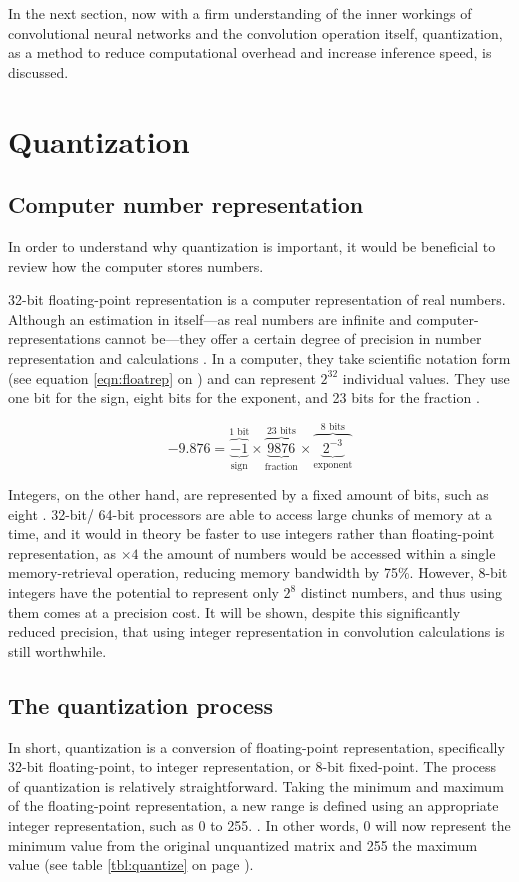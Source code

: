 In the next section, now with a firm understanding of the inner workings of convolutional neural networks and the convolution operation itself, quantization, as a method to reduce computational overhead and increase inference speed, is discussed.

\section{Quantization}
\subsection{Computer number representation}
In order to understand why quantization is important, it would be beneficial to review how the computer stores numbers.

32-bit floating-point representation is a computer representation of real numbers. Although an estimation in itself---as real numbers are infinite and computer-representations cannot be---they offer a certain degree of precision in number representation and calculations \cite{ieee}. In a computer, they take scientific notation form (see equation \ref{eqn:floatrep} on \pageref{eqn:floatrep}) and can represent $2^{32}$ individual values. They use one bit for the sign, eight bits for the exponent, and 23 bits for the fraction \cite{ieee}.

\begin{equation}
\label{eqn:floatrep}
-9.876 = \overbrace{\underbrace{-1}_\text{sign}}^\text{1 bit}\times\overbrace{\underbrace{9876}_\text{fraction}}^\text{23 bits}\times\overbrace{\underbrace{2^{-3}}_\text{exponent}}^\text{8 bits}
\end{equation}

Integers, on the other hand, are represented by a fixed amount of bits, such as eight \cite{ieee}. 32-bit/ 64-bit processors are able to access large chunks of memory at a time, and it would in theory be faster to use integers rather than floating-point representation, as $\times4$ the amount of numbers would be accessed within a single memory-retrieval operation, reducing memory bandwidth by 75\%. However, 8-bit integers have the potential to represent only $2^{8}$ distinct numbers, and thus using them comes at a precision cost. It will be shown, despite this significantly reduced precision, that using integer representation in convolution calculations is still worthwhile.

\subsection{The quantization process}
In short, quantization is a conversion of floating-point representation, specifically 32-bit floating-point, to integer representation, or 8-bit fixed-point. The process of quantization is relatively straightforward. Taking the minimum and maximum of the floating-point representation, a new range is defined using an appropriate integer representation, such as 0 to 255. \cite{warden_quantize}. In other words, 0 will now represent the minimum value from the original unquantized matrix and 255 the maximum value (see table \ref{tbl:quantize} on page \pageref{tbl:quantize}).

